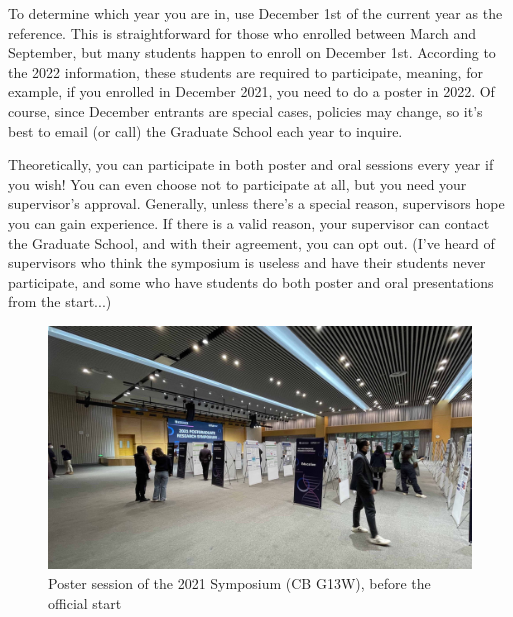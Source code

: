 To determine which year you are in, use December 1st of the current year as the reference. This is straightforward for those who enrolled between March and September, but many students happen to enroll on December 1st. According to the 2022 information, these students are required to participate, meaning, for example, if you enrolled in December 2021, you need to do a poster in 2022.
%
Of course, since December entrants are special cases, policies may change, so it's best to email (or call) the Graduate School each year to inquire.

Theoretically, you can participate in both poster and oral sessions every year if you wish! You can even choose not to participate at all, but you need your supervisor's approval. Generally, unless there's a special reason, supervisors hope you can gain experience. If there is a valid reason, your supervisor can contact the Graduate School, and with their agreement, you can opt out. (I've heard of supervisors who think the symposium is useless and have their students never participate, and some who have students do both poster and oral presentations from the start...)

\begin{figure}[H]
    \caption{Poster session of the 2021 Symposium (CB G13W), before the official start}
    \centering
    \includegraphics[width=\columnwidth]{author-folder/Kai.Wu/synposium_poster.jpg}
\end{figure}

